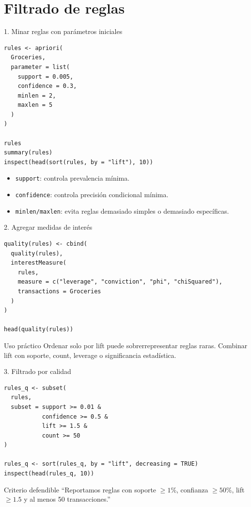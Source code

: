 \documentclass[10pt,aspectratio=169]{beamer}
\begin{document}
\section{Filtrado de reglas}

\begin{frame}[fragile]{1. Minar reglas con parámetros iniciales}
\begin{lstlisting}[style=rcode]
rules <- apriori(
  Groceries,
  parameter = list(
    support = 0.005,
    confidence = 0.3,
    minlen = 2,
    maxlen = 5
  )
)

rules
summary(rules)
inspect(head(sort(rules, by = "lift"), 10))
\end{lstlisting}

\begin{itemize}
  \item \texttt{support}: controla prevalencia mínima.
  \item \texttt{confidence}: controla precisión condicional mínima.
  \item \texttt{minlen/maxlen}: evita reglas demasiado simples o demasiado específicas.
\end{itemize}
\end{frame}

\begin{frame}[fragile]{2. Agregar medidas de interés}
\begin{lstlisting}[style=rcode]
quality(rules) <- cbind(
  quality(rules),
  interestMeasure(
    rules,
    measure = c("leverage", "conviction", "phi", "chiSquared"),
    transactions = Groceries
  )
)

head(quality(rules))
\end{lstlisting}

\begin{block}{Uso práctico}
Ordenar solo por lift puede sobrerrepresentar reglas raras. Combinar lift con soporte, count, leverage o significancia estadística.
\end{block}
\end{frame}

\begin{frame}[fragile]{3. Filtrado por calidad}
\begin{lstlisting}[style=rcode]
rules_q <- subset(
  rules,
  subset = support >= 0.01 &
           confidence >= 0.5 &
           lift >= 1.5 &
           count >= 50
)

rules_q <- sort(rules_q, by = "lift", decreasing = TRUE)
inspect(head(rules_q, 10))
\end{lstlisting}

\begin{exampleblock}{Criterio defendible}
``Reportamos reglas con soporte $\geq 1\%$, confianza $\geq 50\%$, lift $\geq 1.5$ y al menos 50 transacciones.''
\end{exampleblock}
\end{frame}
\end{document}
